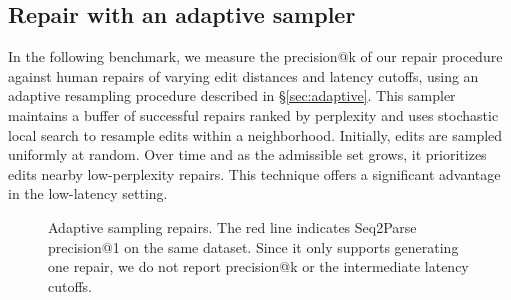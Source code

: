 \documentclass[sigplan,review,anonymous,acmsmall]{acmart}\settopmatter{printfolios=false,printccs=false,printacmref=false}
\begin{document}

\subsection{Repair with an adaptive sampler}

In the following benchmark, we measure the precision@k of our repair procedure against human repairs of varying edit distances and latency cutoffs, using an adaptive resampling procedure described in \S\ref{sec:adaptive}. This sampler maintains a buffer of successful repairs ranked by perplexity and uses stochastic local search to resample edits within a neighborhood. Initially, edits are sampled uniformly at random. Over time and as the admissible set grows, it prioritizes edits nearby low-perplexity repairs. This technique offers a significant advantage in the low-latency setting.

\begin{figure}[H]
\resizebox{.24\textwidth}{!}{}
\resizebox{.25\textwidth}{!}{}
\resizebox{.24\textwidth}{!}{}
\resizebox{.24\textwidth}{!}{}
\caption{Adaptive sampling repairs. The red line indicates Seq2Parse precision@1 on the same dataset. Since it only supports generating one repair, we do not report precision@k or the intermediate latency cutoffs.}\label{fig:adaptive}
\end{figure}
\end{document}
